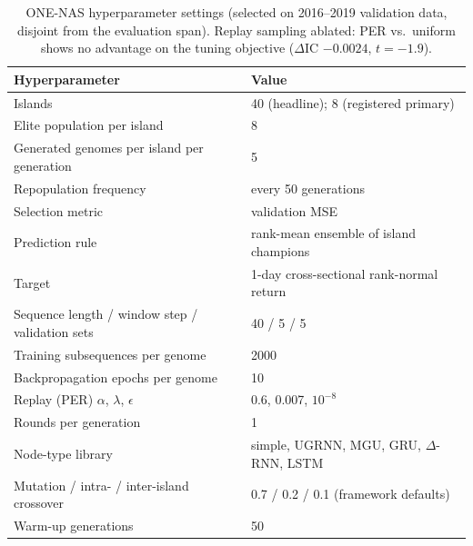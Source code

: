 \begin{table}[h]
\centering
\caption{ONE-NAS hyperparameter settings (selected on 2016--2019
validation data, disjoint from the evaluation span). Replay sampling
ablated: PER vs.\ uniform shows no advantage on the tuning objective
($\Delta$IC $-0.0024$, $t{=}-1.9$).}
\label{tab:hps}
\begin{tabular}{ll}
\toprule
Hyperparameter & Value \\
\midrule
Islands & 40 (headline); 8 (registered primary) \\
Elite population per island & 8 \\
Generated genomes per island per generation & 5 \\
Repopulation frequency & every 50 generations \\
Selection metric & validation MSE \\
Prediction rule & rank-mean ensemble of island champions \\
Target & 1-day cross-sectional rank-normal return \\
Sequence length / window step / validation sets & 40 / 5 / 5 \\
Training subsequences per genome & 2000 \\
Backpropagation epochs per genome & 10 \\
Replay (PER) $\alpha$, $\lambda$, $\epsilon$ & 0.6, 0.007, $10^{-8}$ \\
Rounds per generation & 1 \\
Node-type library & simple, UGRNN, MGU, GRU, $\Delta$-RNN, LSTM \\
Mutation / intra- / inter-island crossover & 0.7 / 0.2 / 0.1 (framework defaults) \\
Warm-up generations & 50 \\
\bottomrule
\end{tabular}
\end{table}
